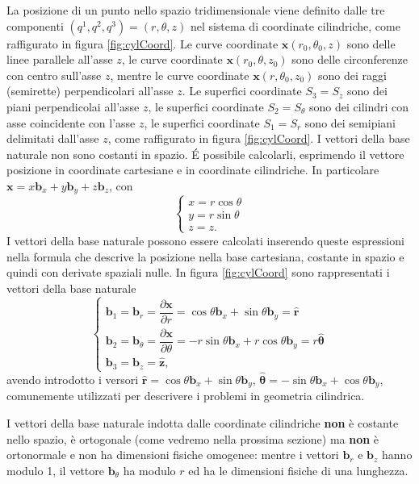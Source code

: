 \begin{example}
 La posizione di un punto nello spazio tridimensionale viene definito dalle tre componenti $(q^1, q^2, q^3)=(r,\theta,z)$ nel sistema di coordinate cilindriche, come raffigurato in figura \ref{fig:cylCoord}. Le curve coordinate $\bm{x}(r_0,\theta_0,z)$ sono delle linee parallele all'asse $z$, le curve coordinate $\bm{x}(r_0,\theta,z_0)$ sono delle circonferenze con centro sull'asse $z$, mentre le curve coordinate $\bm{x}(r,\theta_0,z_0)$ sono dei raggi (semirette) perpendicolari all'asse $z$. Le superfici coordinate $S_3=S_z$ sono dei piani perpendicolai all'asse $z$, le superfici coordinate $S_2=S_{\theta}$ sono dei cilindri con asse coincidente con l'asse $z$, le superfici coordinate $S_1 = S_r$ sono dei semipiani delimitati dall'asse $z$, come raffigurato in figura \ref{fig:cylCoord}. I vettori della base naturale non sono costanti in spazio. \'E possibile calcolarli, esprimendo il vettore posizione in coordinate cartesiane e in coordinate cilindriche. In particolare $\bm{x} = x \bm{b}_x + y \bm{b}_y + z \bm{b}_z$, con
\begin{equation}
 \begin{cases}
  x = r \cos \theta \\   y = r \sin \theta \\ z = z .
 \end{cases}
\end{equation}
I vettori della base naturale possono essere calcolati inserendo queste espressioni nella formula che descrive la posizione nella base cartesiana, costante in spazio e quindi con derivate spaziali nulle. In figura \ref{fig:cylCoord} sono rappresentati i vettori della base naturale
\begin{equation}
 \begin{cases}
  \bm{b}_1 = \bm{b}_r = \dfrac{\partial \bm{x}}{\partial r} = \cos \theta \bm{b}_x + \sin \theta \bm{b}_y  = \bm{\hat{r}} \\
  \bm{b}_2 = \bm{b}_{\theta} = \dfrac{\partial \bm{x}}{\partial \theta} = -r \sin \theta \bm{b}_x + r \cos \theta \bm{b}_y = r \bm{\hat{\theta}}\\
  \bm{b}_3 =  \bm{b}_z = \bm{\hat{z}} ,
 \end{cases}
\end{equation}
avendo introdotto i versori $\bm{\hat{r}} = \cos \theta \bm{b}_x + \sin \theta \bm{b}_y$, $\bm{\hat{\theta}}= -\sin \theta \bm{b}_x + \cos \theta \bm{b}_y$, comunemente utilizzati per descrivere i problemi in geometria cilindrica.
\begin{remark}
 I vettori della base naturale indotta dalle coordinate cilindriche \textbf{non} è costante nello spazio, è ortogonale (come vedremo nella prossima sezione) ma \textbf{non} è ortonormale e non ha dimensioni fisiche omogenee: mentre i vettori $\bm{b}_r$ e $\bm{b}_z$ hanno modulo 1, il vettore $\bm{b}_\theta$ ha modulo $r$ ed ha le dimensioni fisiche di una lunghezza.
\end{remark}
\end{example}

